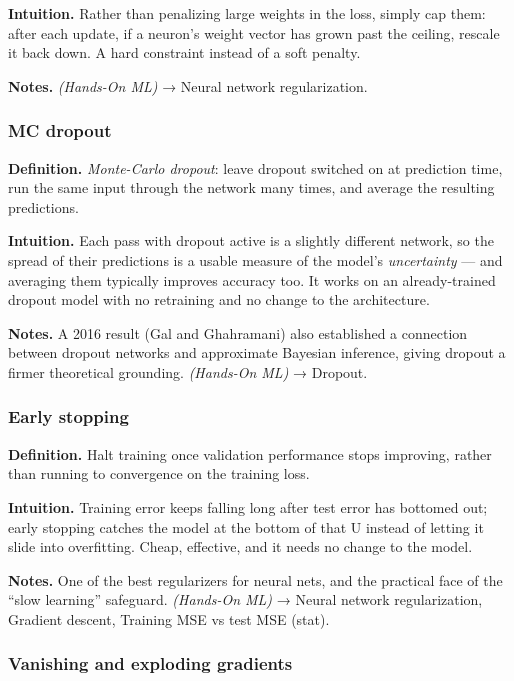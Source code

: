 \documentclass[
  10pt,
  letterpaper,
  onecolumn]{article}
\begin{document}
\textbf{Intuition.} Rather than penalizing large weights in the loss,
simply cap them: after each update, if a neuron's weight vector has
grown past the ceiling, rescale it back down. A hard constraint instead
of a soft penalty.

\textbf{Notes.} \emph{(Hands-On ML)} → Neural network regularization.

\hypertarget{mc-dropout}{%
\subsubsection{MC dropout}\label{mc-dropout}}

\textbf{Definition.} \emph{Monte-Carlo dropout}: leave dropout switched
on at prediction time, run the same input through the network many
times, and average the resulting predictions.

\textbf{Intuition.} Each pass with dropout active is a slightly
different network, so the spread of their predictions is a usable
measure of the model's \emph{uncertainty} --- and averaging them
typically improves accuracy too. It works on an already-trained dropout
model with no retraining and no change to the architecture.

\textbf{Notes.} A 2016 result (Gal and Ghahramani) also established a
connection between dropout networks and approximate Bayesian inference,
giving dropout a firmer theoretical grounding. \emph{(Hands-On ML)} →
Dropout.

\hypertarget{early-stopping}{%
\subsubsection{Early stopping}\label{early-stopping}}

\textbf{Definition.} Halt training once validation performance stops
improving, rather than running to convergence on the training loss.

\textbf{Intuition.} Training error keeps falling long after test error
has bottomed out; early stopping catches the model at the bottom of that
U instead of letting it slide into overfitting. Cheap, effective, and it
needs no change to the model.

\textbf{Notes.} One of the best regularizers for neural nets, and the
practical face of the ``slow learning'' safeguard. \emph{(Hands-On ML)}
→ Neural network regularization, Gradient descent, Training MSE vs test
MSE (stat).

\hypertarget{vanishing-and-exploding-gradients}{%
\subsubsection{Vanishing and exploding
gradients}\label{vanishing-and-exploding-gradients}}
\end{document}
